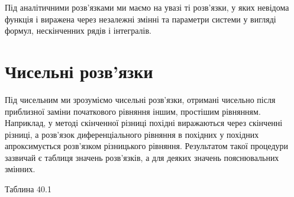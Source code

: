 \documentclass[
  ukrainian,
]{article}
\begin{document}
Під аналітичними розв'язками ми маємо на увазі ті розв'язки, у яких
невідома функція і виражена через незалежні змінні та параметри системи
у вигляді формул, нескінченних рядів і інтегралів.

\section{Чисельні
розв'язки}\label{ux447ux438ux441ux435ux43bux44cux43dux456-ux440ux43eux437ux432ux44fux437ux43aux438}

Під чисельним ми зрозуміємо чисельні розв'язки, отримані чисельно після
приблизної заміни початкового рівняння іншим, простішим рівнянням.
Наприклад, у методі скінченної різниці похідні виражаються через
скінченні різниці, а розв'язок диференціального рівняння в похідних у
похідних апроксимується розв'язком різницького рівняння. Результатом
такої процедури зазвичай є таблиця значень розв'язків, а для деяких
значень пояснювальних змінних.

Таблина 40.1
\end{document}
